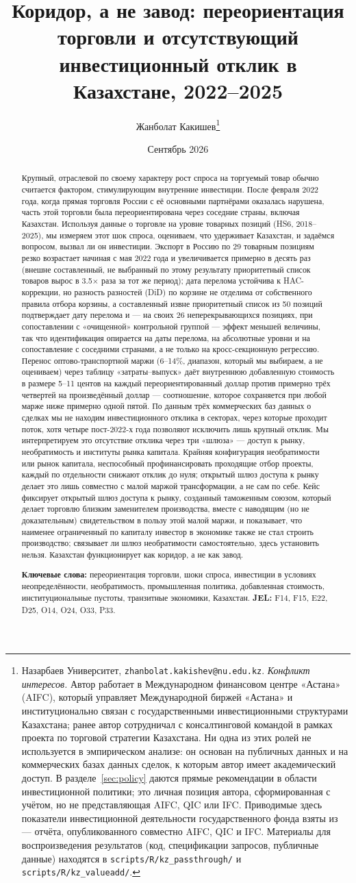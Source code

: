 \documentclass[12pt]{article}
\title{Коридор, а не завод: переориентация торговли и отсутствующий\\
инвестиционный отклик в Казахстане, 2022--2025}
\author{Жанболат Какишев\thanks{Назарбаев Университет, \texttt{zhanbolat.kakishev@nu.edu.kz}.
\emph{Конфликт интересов.} Автор работает в Международном финансовом центре «Астана»
(AIFC), который управляет Международной биржей «Астана» и институционально связан с
государственными инвестиционными структурами Казахстана; ранее автор сотрудничал с
консалтинговой командой в рамках проекта по торговой стратегии Казахстана. Ни одна из
этих ролей не используется в эмпирическом анализе: он основан на публичных данных и на
коммерческих базах данных сделок, к которым автор имеет академический доступ.
В разделе~\ref{sec:policy} даются прямые рекомендации в области инвестиционной политики;
это личная позиция автора, сформированная с учётом, но не представляющая AIFC, QIC или
IFC. Приводимые здесь показатели инвестиционной деятельности государственного фонда взяты
из \citet{qicaifcifc2026pe} — отчёта, опубликованного совместно AIFC, QIC и IFC.
Материалы для воспроизведения результатов (код, спецификации запросов, публичные данные)
находятся в \texttt{scripts/R/kz\_passthrough/} и \texttt{scripts/R/kz\_valueadd/}.}}
\date{Сентябрь 2026}
\begin{document}
\maketitle

\begin{abstract}
\noindent Крупный, отраслевой по своему характеру рост спроса на торгуемый товар обычно
считается фактором, стимулирующим внутренние инвестиции. После февраля 2022 года, когда
прямая торговля России с её основными партнёрами оказалась нарушена, часть этой торговли
была переориентирована через соседние страны, включая Казахстан. Используя данные о
торговле на уровне товарных позиций (HS6, 2018--2025), мы измеряем этот шок спроса,
оцениваем, что удерживает Казахстан, и задаёмся вопросом, вызвал ли он инвестиции. Экспорт
в Россию по 29 товарным позициям резко возрастает начиная с мая 2022 года и увеличивается
примерно в десять раз (внешне составленный, не выбранный по этому результату приоритетный
список товаров вырос в 3.5$\times$ раза за тот же период); дата перелома устойчива к
HAC-коррекции, но разность разностей (DiD) по корзине не отделима от собственного правила
отбора корзины, а составленный извне приоритетный список из 50 позиций подтверждает дату
перелома и — на своих 26 неперекрывающихся позициях, при сопоставлении с «очищенной»
контрольной группой — эффект меньшей величины, так что идентификация опирается на даты
перелома, на абсолютные уровни и на сопоставление с соседними странами, а не только на
кросс-секционную регрессию. Перенос оптово-транспортной маржи (6--14\%, диапазон, который
мы выбираем, а не оцениваем) через таблицу «затраты--выпуск» даёт внутреннюю добавленную
стоимость в размере 5--11 центов на каждый переориентированный доллар против примерно
трёх четвертей на произведённый доллар — соотношение, которое сохраняется при любой марже
ниже примерно одной пятой. По данным трёх коммерческих баз данных о сделках мы не находим
инвестиционного отклика в секторах, через которые проходит поток, хотя четыре
пост-2022-х года позволяют исключить лишь крупный отклик. Мы интерпретируем это отсутствие
отклика через три «шлюза» --- доступ к рынку, необратимость и институты рынка капитала.
Крайняя конфигурация необратимости или рынок капитала, неспособный профинансировать
проходящие отбор проекты, каждый по отдельности снижают отклик до нуля; открытый шлюз
доступа к рынку делает это лишь совместно с малой маржой трансформации, а не сам по себе.
Кейс фиксирует открытый шлюз доступа к рынку, созданный таможенным союзом, который делает
торговлю близким заменителем производства, вместе с наводящим (но не доказательным)
свидетельством в пользу этой малой маржи, и показывает, что наименее ограниченный по
капиталу инвестор в экономике также не стал строить производство; связывает ли шлюз
необратимости самостоятельно, здесь установить нельзя. Казахстан функционирует как
коридор, а не как завод.

\medskip
\noindent\textbf{Ключевые слова:} переориентация торговли, шоки спроса, инвестиции в
условиях неопределённости, необратимость, промышленная политика, добавленная стоимость,
институциональные пустоты, транзитные экономики, Казахстан.
\quad\textbf{JEL:} F14, F15, E22, D25, O14, O24, O33, P33.
\end{abstract}
\end{document}
